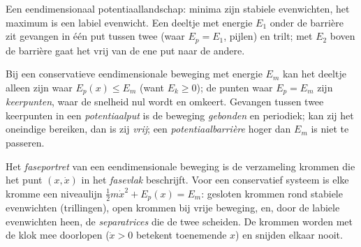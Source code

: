 \begin{omfigure}

{\small Een eendimensionaal potentiaallandschap: minima zijn stabiele
evenwichten, het maximum is een labiel evenwicht. Een deeltje met energie $E_1$
onder de barrière zit gevangen in één put tussen twee \emph{}
(waar $E_p = E_1$, pijlen) en trilt; met $E_2$ boven
de barrière gaat het vrij van de ene put naar de andere.}
\end{omfigure}

\begin{definition}\label{def:b1:work-and-energy:turning}
Bij een conservatieve eendimensionale beweging met energie $E_m$ kan het deeltje
alleen zijn waar $E_p(x) \leq E_m$ (want $E_k \geq 0$); de punten waar
$E_p = E_m$ zijn \emph{keerpunten}, waar de snelheid nul wordt en
omkeert. Gevangen tussen twee keerpunten in een \emph{potentiaalput}
is de beweging \emph{gebonden} en periodiek; kan zij het oneindige bereiken, dan is zij
\emph{vrij}; een \emph{potentiaalbarrière} hoger dan $E_m$ is niet te
passeren.
\end{definition}

\begin{definition}[Faseportret]\label{def:b1:work-and-energy:phase}
Het \emph{faseportret} van een eendimensionale beweging is de verzameling
krommen die het punt $(x, \dot x)$ in het \emph{fasevlak} beschrijft. Voor
een conservatief systeem is elke kromme een niveaulijn $\tfrac12 m\dot x^2 +
E_p(x) = E_m$: gesloten krommen rond stabiele evenwichten (trillingen),
open krommen bij vrije beweging, en, door de labiele evenwichten heen, de
\emph{separatrices} die de twee scheiden. De krommen worden met de klok mee doorlopen
($\dot x > 0$ betekent toenemende $x$) en snijden elkaar nooit.
\end{definition}

